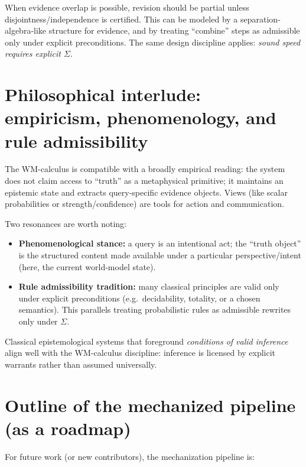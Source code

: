 \documentclass[11pt]{article}
\newcommand{\side}{\ensuremath{\Sigma}}
\begin{document}
When evidence overlap is possible, revision should be partial unless disjointness/independence is certified.
This can be modeled by a separation-algebra-like structure for evidence, and by treating ``combine'' steps as admissible
only under explicit preconditions. The same design discipline applies:
\emph{sound speed requires explicit \side.}

\section{Philosophical interlude: empiricism, phenomenology, and rule admissibility}

The WM-calculus is compatible with a broadly empirical reading:
the system does not claim access to ``truth'' as a metaphysical primitive;
it maintains an epistemic state and extracts query-specific evidence objects.
Views (like scalar probabilities or strength/confidence) are tools for action and communication.

Two resonances are worth noting:
\begin{itemize}[leftmargin=2em]
\item \textbf{Phenomenological stance:} a query is an intentional act; the ``truth object'' is the structured content
made available under a particular perspective/intent (here, the current world-model state).
\item \textbf{Rule admissibility tradition:} many classical principles are valid only under explicit preconditions
(e.g.\ decidability, totality, or a chosen semantics). This parallels treating probabilistic rules as admissible rewrites
only under \side.
\end{itemize}

Classical epistemological systems that foreground \emph{conditions of valid inference} align well with the WM-calculus
discipline: inference is licensed by explicit warrants rather than assumed universally.

\section{Outline of the mechanized pipeline (as a roadmap)}

For future work (or new contributors), the mechanization pipeline is:
\end{document}
